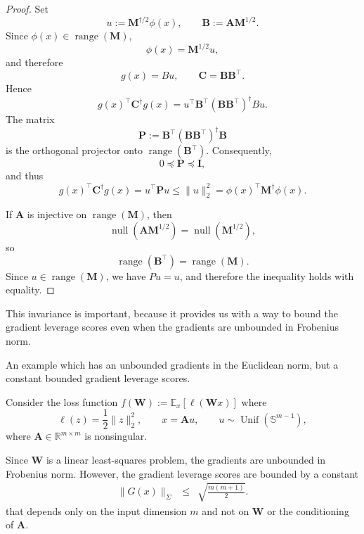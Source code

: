 \documentclass[11pt]{article}
\newcommand{\mat}[1]{\bm{#1}}
\newcommand{\EE}[2]{\mathbb{E}_{#1}\left[#2\right] }
\begin{document}
\begin{proof}
Set
\[
    u := \mat{M}^{\dagger/2}\phi(x),
    \qquad
    \mat{B} := \mat{A}\mat{M}^{1/2}.
\]
Since $\phi(x)\in\operatorname{range}(\mat{M})$,
\[
    \phi(x)=\mat{M}^{1/2}u,
\]
and therefore
\[
    g(x)=Bu,
    \qquad
    \mat{C}=\mat{B}\mat{B}^\top.
\]
Hence
\[
    g(x)^\top \mat{C}^\dagger g(x)
    =
    u^\top \mat{B}^\top(\mat{B}\mat{B}^\top)^\dagger Bu.
\]
The matrix
\[
    \mat{P}:=\mat{B}^\top(\mat{B}\mat{B}^\top)^\dagger \mat{B}
\]
is the orthogonal projector onto $\operatorname{range}(\mat{B}^\top)$.
Consequently,
\[
    0\preceq \mat{P}\preceq \mat{I},
\]
and thus
\[
    g(x)^\top \mat{C}^\dagger g(x)
    =
    u^\top \mat{P} u
    \leq
    \|u\|_2^2
    =
    \phi(x)^\top \mat{M}^\dagger\phi(x).
\]

If $\mat{A}$ is injective on $\operatorname{range}(\mat{M})$, then
\[
    \operatorname{null}(\mat{A}\mat{M}^{1/2})
    =
    \operatorname{null}(\mat{M}^{1/2}),
\]
so
\[
    \operatorname{range}(\mat{B}^\top)
    =
    \operatorname{range}(\mat{M}).
\]
Since $u\in\operatorname{range}(\mat{M})$, we have $Pu=u$, and therefore the
inequality holds with equality.
\end{proof}





This invariance is important, because it provides us with a way to bound the gradient leverage scores even when the gradients are unbounded in Frobenius norm.



 An example which has an unbounded gradients in the Euclidean norm, but a constant bounded gradient leverage scores.
\begin{lemma} \label{lem:leverage-bound-sphere}
Consider the loss function $f(\mat{W}) :=  \EE{x}{\ell(\mat{W}x)}$ where
\[
    \ell(z) = \frac{1}{2}\|z\|_2^2,
    \qquad
    x = \mat{A} u,
    \qquad
    u \sim \operatorname{Unif}(\mathbb{S}^{m-1}),
\]
where $\mat{A} \in \mathbb{R}^{m\times m}$ is nonsingular.

Since $\mat{W}$ is a linear least-squares problem, the gradients are unbounded in Frobenius norm. 
However, the gradient leverage scores are bounded by a constant 
\begin{eqnarray} \label{eq:leverage-bound-sphere}
 \| G(x) \|_{\Sigma} & \leq & \sqrt{\frac{m(m+1)}{2}}.
\end{eqnarray}
that depends only on the input dimension $m$ and not on $\mat{W}$ or the conditioning of $\mat{A}$.

\end{lemma}
\end{document}
